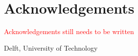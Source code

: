 %
\chapter{Acknowledgements}%

\textcolor{red}{Acknowledgements still needs to be written}

%



\vspace*{15mm}

Delft, University of Technology \hfill \mscname \\
\mscdate